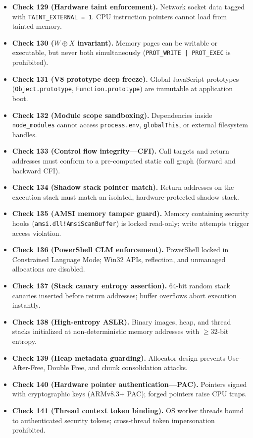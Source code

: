\documentclass{portalciencia}
\theoremstyle{plain}
\theoremstyle{definition}
\begin{document}
\begin{itemize}
  \item \textbf{Check 129 (Hardware taint enforcement).} Network socket data tagged with \texttt{TAINT\_EXTERNAL = 1}. CPU instruction pointers cannot load from tainted memory.
  \item \textbf{Check 130 ($W \oplus X$ invariant).} Memory pages can be writable or executable, but never both simultaneously (\texttt{PROT\_WRITE | PROT\_EXEC} is prohibited).
  \item \textbf{Check 131 (V8 prototype deep freeze).} Global JavaScript prototypes (\texttt{Object.prototype}, \texttt{Function.prototype}) are immutable at application boot.
  \item \textbf{Check 132 (Module scope sandboxing).} Dependencies inside \texttt{node\_modules} cannot access \texttt{process.env}, \texttt{globalThis}, or external filesystem handles.
  \item \textbf{Check 133 (Control flow integrity---CFI).} Call targets and return addresses must conform to a pre-computed static call graph (forward and backward CFI).
  \item \textbf{Check 134 (Shadow stack pointer match).} Return addresses on the execution stack must match an isolated, hardware-protected shadow stack.
  \item \textbf{Check 135 (AMSI memory tamper guard).} Memory containing security hooks (\texttt{amsi.dll!AmsiScanBuffer}) is locked read-only; write attempts trigger access violation.
  \item \textbf{Check 136 (PowerShell CLM enforcement).} PowerShell locked in Constrained Language Mode; Win32 APIs, reflection, and unmanaged allocations are disabled.
  \item \textbf{Check 137 (Stack canary entropy assertion).} 64-bit random stack canaries inserted before return addresses; buffer overflows abort execution instantly.
  \item \textbf{Check 138 (High-entropy ASLR).} Binary images, heap, and thread stacks initialized at non-deterministic memory addresses with $\ge 32$-bit entropy.
  \item \textbf{Check 139 (Heap metadata guarding).} Allocator design prevents Use-After-Free, Double Free, and chunk consolidation attacks.
  \item \textbf{Check 140 (Hardware pointer authentication---PAC).} Pointers signed with cryptographic keys (ARMv8.3+ PAC); forged pointers raise CPU traps.
  \item \textbf{Check 141 (Thread context token binding).} OS worker threads bound to authenticated security tokens; cross-thread token impersonation prohibited.

\end{itemize}
\end{document}
